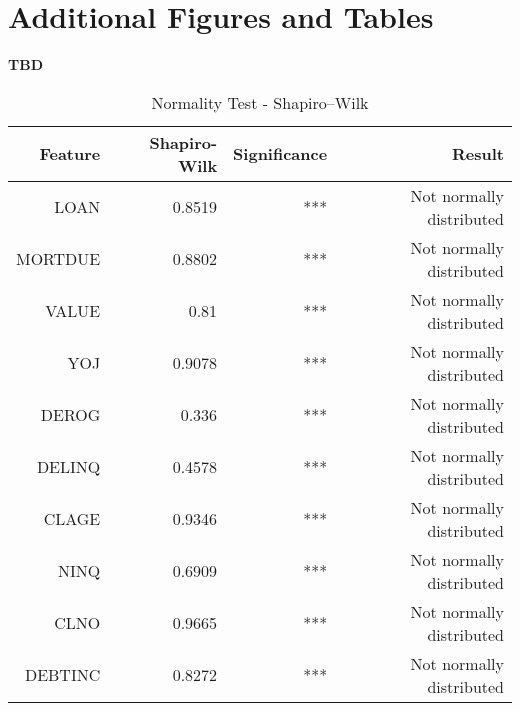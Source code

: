 \chapter{Additional Figures and Tables}

\textbf{TBD}

\begin{table}[H]
    \small
    \setlength{\tabcolsep}{8pt}
    \renewcommand{\arraystretch}{1.3}
    \centering
        \caption[Normality Test - Shapiro--Wilk]{Normality Test - Shapiro--Wilk}\label{tab:normalitytest}
        \begin{tabular}{rrrr}
    \toprule
    \textbf{Feature} & \textbf{Shapiro-Wilk} & \textbf{Significance} & \textbf{Result }\\
    \midrule
    \hline
    LOAN & 0.8519 & *** & Not normally distributed \\ 
    MORTDUE & 0.8802 & *** & Not normally distributed \\ 
    VALUE & 0.81 & *** & Not normally distributed \\ 
    YOJ & 0.9078 & *** & Not normally distributed \\ 
    DEROG & 0.336 & *** & Not normally distributed \\ 
    DELINQ & 0.4578 & *** & Not normally distributed \\ 
    CLAGE & 0.9346 & *** & Not normally distributed \\ 
    NINQ & 0.6909 & *** & Not normally distributed \\ 
    CLNO & 0.9665 & *** & Not normally distributed \\ 
    DEBTINC & 0.8272 & *** & Not normally distributed \\
    \hline
    \bottomrule
    \end{tabular}
    \vspace{0.35em}

        \vspace{-1em}
\end{table}



